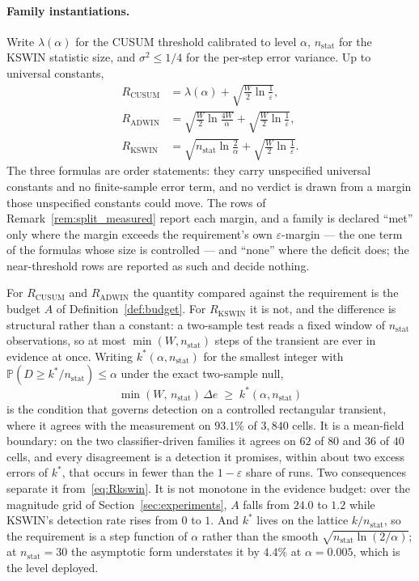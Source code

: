 \paragraph{Family instantiations.} Write $\lambda(\alpha)$ for the CUSUM
threshold calibrated to level $\alpha$, $n_{\mathrm{stat}}$ for the KSWIN
statistic size, and $\sigma^2 \le 1/4$ for the per-step error variance.
Up to universal constants,
\begin{align}
  R_{\mathrm{CUSUM}} &= \lambda(\alpha)
     + \sqrt{\tfrac{W}{2}\ln \tfrac{1}{\varepsilon}},
     \label{eq:Rcusum} \\
  R_{\mathrm{ADWIN}} &= \sqrt{\tfrac{W}{2}\ln \tfrac{4W}{\alpha}}
     + \sqrt{\tfrac{W}{2}\ln \tfrac{1}{\varepsilon}},
     \label{eq:Radwin} \\
  R_{\mathrm{KSWIN}} &= \sqrt{n_{\mathrm{stat}} \ln \tfrac{2}{\alpha}}
     + \sqrt{\tfrac{W}{2}\ln \tfrac{1}{\varepsilon}} .
     \label{eq:Rkswin}
\end{align}
The three formulas are order statements: they carry unspecified universal
constants and no finite-sample error term, and no verdict is drawn from a
margin those unspecified constants could move. The rows of
Remark~\ref{rem:split_measured} report each margin, and a family is declared
``met'' only where the margin exceeds the requirement's own $\varepsilon$-margin
--- the one term of the formulas whose size is controlled --- and ``none''
where the deficit does; the near-threshold rows are reported as such and
decide nothing.

For $R_{\mathrm{CUSUM}}$ and $R_{\mathrm{ADWIN}}$ the quantity compared against
the requirement is the budget $A$ of Definition~\ref{def:budget}. For
$R_{\mathrm{KSWIN}}$ it is not, and the difference is structural rather than a
constant: a two-sample test reads a fixed window of $n_{\mathrm{stat}}$
observations, so at most $\min(W, n_{\mathrm{stat}})$ steps of the transient
are ever in evidence at once. Writing $k^*(\alpha, n_{\mathrm{stat}})$ for the
smallest integer with
$\mathbb{P}(D \ge k^*/n_{\mathrm{stat}}) \le \alpha$ under the exact
two-sample null,
\begin{equation}\label{eq:Rkswin_contrast}
  \min(W,\, n_{\mathrm{stat}})\,\Delta e \;\ge\; k^*(\alpha, n_{\mathrm{stat}})
\end{equation}
is the condition that governs detection on a controlled rectangular transient, where it agrees
with the measurement on $93.1\%$ of $3{,}840$ cells. It is a mean-field boundary: on the two
classifier-driven families it agrees on $62$ of $80$ and $36$ of $40$ cells, and every disagreement
is a detection it promises, within about two excess errors of $k^*$, that occurs in fewer than the
$1-\varepsilon$ share of runs. Two consequences separate it from~\eqref{eq:Rkswin}. It is not monotone in the evidence budget: over the
magnitude grid of Section~\ref{sec:experiments}, $A$ falls from $24.0$ to $1.2$
while KSWIN's detection rate rises from $0$ to $1$. And $k^*$ lives on the
lattice $k/n_{\mathrm{stat}}$, so the requirement is a step function of
$\alpha$ rather than the smooth $\sqrt{n_{\mathrm{stat}}\ln(2/\alpha)}$;
at $n_{\mathrm{stat}} = 30$ the asymptotic form understates it by $4.4\%$ at
$\alpha = 0.005$, which is the level deployed.

